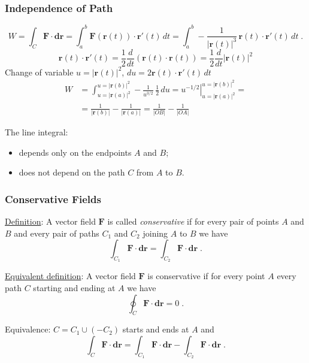 \begin{frame}
    \frametitle{Independence of Path}
$$
  W  = \int_C \textbf{F} \cdot \textbf{dr} = \int_a^b \textbf{F}(\textbf{r}(t)) \cdot \textbf{r}'(t) \, dt = \int_a^b - \frac{1}{|\textbf{r}(t)|^3} \, \textbf{r}(t) \cdot \textbf{r}'(t) \, dt \; .
$$
%
\pause
%
$$\textbf{r}(t) \cdot \textbf{r}'(t)  = \frac{1}{2} \frac{d}{dt}(\textbf{r}(t) \cdot \textbf{r}(t)) = \frac{1}{2} \frac{d}{dt}|\textbf{r}(t)|^2$$
%
\pause Change of variable $u=|\textbf{r}(t)|^2$, $du = 2 \textbf{r}(t) \cdot \textbf{r}'(t)\, dt$
%
%
\begin{align*}
  W & = \int_{u=|\textbf{r}(a)|^2}^{u=|\textbf{r}(b)|^2} -\frac{1}{u^{3/2}} \, \frac{1}{2} \, du = \left. u^{-1/2} \right|_{u=|\textbf{r}(a)|^2}^{u=|\textbf{r}(b)|^2} = \\
  & = \frac{1}{|\textbf{r}(b)|} - \frac{1}{|\textbf{r}(a)|} = \frac{1}{|OB|} - \frac{1}{|OA|}
\end{align*}

\pause The line integral:
 \begin{itemize}
   \item \pause depends only on the endpoints $A$ and $B$;
   \item \pause does not depend on the path $C$ from $A$ to $B$.
 \end{itemize}
\end{frame}

\begin{frame}
  \frametitle{Conservative Fields}

  \underline{Definition}: A vector field $\textbf{F}$ is called \emph{conservative} if for every pair of points $A$ and $B$ and every pair of paths $C_1$ and $C_2$ joining $A$ to $B$ we have
%
$$\int_{C_1} \textbf{F} \cdot \textbf{dr} = \int_{C_2} \textbf{F}\cdot \textbf{dr}\; .$$

\pause \underline{Equivalent definition}: A vector field $\textbf{F}$ is conservative if for every point $A$ every path $C$ starting and ending at $A$ we have
%
$$\oint_{C} \textbf{F} \cdot \textbf{dr} = 0\; .$$

\pause Equivalence: $C = C_1 \cup (-C_2)$ starts and ends at $A$ and
%
$$\int_{C} \textbf{F} \cdot \textbf{dr} = \int_{C_1} \textbf{F} \cdot \textbf{dr} - \int_{C_2} \textbf{F} \cdot \textbf{dr}\; .$$
\end{frame}

